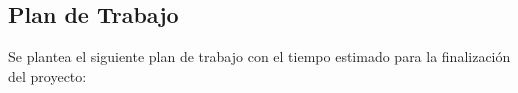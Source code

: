 \documentclass[10pt,a4paper]{article}
\begin{document}
	
	
	
	
	\clearpage
	\subsection{Plan de Trabajo}
	
	Se plantea el siguiente plan de trabajo con el tiempo estimado para la finalización del proyecto:
	
\end{document}
